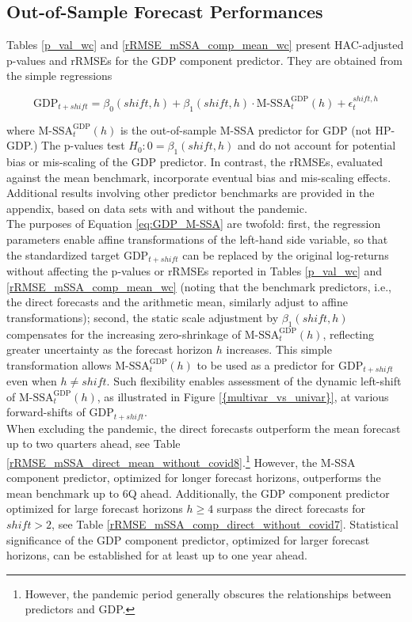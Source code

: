 \documentclass[a4paper]{article}
\begin{document}
\subsection{Out-of-Sample Forecast Performances}\label{oosp}


Tables \ref{p_val_wc} and \ref{rRMSE_mSSA_comp_mean_wc} present HAC-adjusted p-values and rRMSEs for the GDP component predictor. They are obtained from the simple regressions 

\begin{equation}
    \textrm{GDP}_{t+shift}=\beta_0(shift,h)+\beta_1(shift,h) \cdot \textrm{M-SSA}^{\textrm{GDP}}_t(h) + \epsilon_t^{shift,h}
    \label{eq:GDP_M-SSA}
\end{equation}

where $\textrm{M-SSA}^{\textrm{GDP}}_t(h)$ is the out-of-sample M-SSA predictor for GDP (not HP-GDP.)
The p-values test $H_0 : 0 = \beta_1(shift,h)$ and do not account for potential bias or mis-scaling of the GDP predictor. In contrast, the rRMSEs, evaluated against the mean benchmark, incorporate eventual bias and mis-scaling effects. Additional results involving other predictor benchmarks are provided in the appendix, based on data sets with and without the pandemic. \\


The purposes of Equation \ref{eq:GDP_M-SSA} are twofold: first, the regression parameters enable affine transformations of the left-hand side variable, so that the standardized target $\textrm{GDP}_{t+shift}$ can be replaced by the original log-returns without affecting the p-values or rRMSEs reported in Tables \ref{p_val_wc} and \ref{rRMSE_mSSA_comp_mean_wc} (noting that the benchmark predictors, i.e., the direct forecasts and the arithmetic mean, similarly adjust to affine transformations); second, the static scale adjustment by $\beta_1(shift,h)$ compensates for the increasing zero-shrinkage of $\textrm{M-SSA}^{\textrm{GDP}}_t(h)$, reflecting greater uncertainty  as the forecast horizon $h$ increases. This simple transformation allows $\textrm{M-SSA}^{\textrm{GDP}}_t(h)$ to be used as a predictor for $\textrm{GDP}_{t+shift}$ even when $h\neq shift$. Such flexibility enables assessment of the dynamic left-shift of $\textrm{M-SSA}^{\textrm{GDP}}_t(h)$, as illustrated in Figure \ref{{multivar_vs_univar}}, at various forward-shifts of $\textrm{GDP}_{t+shift}$.\\  


When excluding the pandemic, the direct forecasts outperform the mean forecast up to two quarters ahead, see Table \ref{rRMSE_mSSA_direct_mean_without_covid8}.\footnote{However, the pandemic period generally obscures the relationships between predictors and GDP.} However, the M-SSA component predictor, optimized for longer forecast horizons, outperforms the mean benchmark up to 6Q ahead. Additionally, the GDP component predictor optimized for large forecast horizons $h\geq 4$ surpass the direct forecasts for $shift>2$, see Table \ref{rRMSE_mSSA_comp_direct_without_covid7}. Statistical significance of the GDP component predictor, optimized for larger forecast horizons, can be established for at least up to one year ahead.
\end{document}
